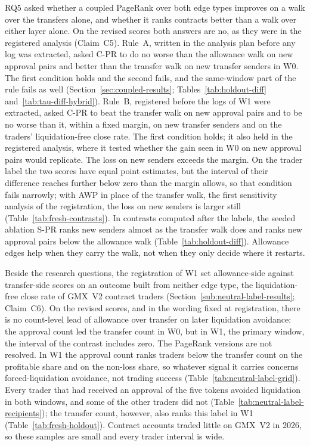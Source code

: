 RQ5 asked whether a coupled PageRank over both edge types improves on a walk over the transfers alone, and whether it ranks contracts better than a walk over either layer alone. On the revised scores both answers are no, as they were in the registered analysis (Claim~C5). Rule~A, written in the analysis plan before any log was extracted, asked C-PR to do no worse than the allowance walk on new approval pairs and better than the transfer walk on new transfer senders in W0. The first condition holds and the second fails, and the same-window part of the rule fails as well (Section~\ref{sec:coupled-results}; Tables~\ref{tab:holdout-diff} and~\ref{tab:tau-diff-hybrid}). Rule~B, registered before the logs of W1 were extracted, asked C-PR to beat the transfer walk on new approval pairs and to be no worse than it, within a fixed margin, on new transfer senders and on the traders' liquidation-free close rate. The first condition holds; it also held in the registered analysis, where it tested whether the gain seen in W0 on new approval pairs would replicate. The loss on new senders exceeds the margin. On the trader label the two scores have equal point estimates, but the interval of their difference reaches further below zero than the margin allows, so that condition fails narrowly; with AWP in place of the transfer walk, the first sensitivity analysis of the registration, the loss on new senders is larger still (Table~\ref{tab:fresh-contrasts}). In contrasts computed after the labels, the seeded ablation S-PR ranks new senders almost as the transfer walk does and ranks new approval pairs below the allowance walk (Table~\ref{tab:holdout-diff}). Allowance edges help when they carry the walk, not when they only decide where it restarts.

Beside the research questions, the registration of W1 set allowance-side against transfer-side scores on an outcome built from neither edge type, the liquidation-free close rate of GMX~V2 contract traders (Section~\ref{sub:neutral-label-results}; Claim~C6). On the revised scores, and in the wording fixed at registration, there is no count-level lead of allowance over transfer on later liquidation avoidance: the approval count led the transfer count in W0, but in W1, the primary window, the interval of the contrast includes zero. The PageRank versions are not resolved. In W1 the approval count ranks traders below the transfer count on the profitable share and on the non-loss share, so whatever signal it carries concerns forced-liquidation avoidance, not trading success (Table~\ref{tab:neutral-label-grid}). Every trader that had received an approval of the five tokens avoided liquidation in both windows, and some of the other traders did not (Table~\ref{tab:neutral-label-recipients}); the transfer count, however, also ranks this label in W1 (Table~\ref{tab:fresh-holdout}). Contract accounts traded little on GMX~V2 in 2026, so these samples are small and every trader interval is wide.

